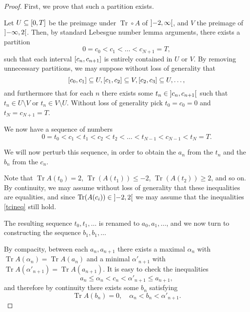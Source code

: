 \documentclass{article}
\theoremstyle{nonumberplain}
\newtheorem{proof}{Proof}
\DeclareMathOperator{\trace}{Tr}
\begin{document}
\begin{proof}
First, we prove that such a partition exists.

Let $U \subseteq \interval 0 T$ be the preimage under $\trace \circ A$ of $\ointerval{-2}\infty$, and $V$ the preimage of $\ointerval{-\infty}2$. Then, by standard Lebesgue number lemma arguments, there exists a partition 
\begin{equation}
0 = c_0 < c_1 < \dots < c_{N+1} = T,
\end{equation}
such that each interval $\interval{c_n}{c_{n+1}}$ is entirely contained in $U$ or $V$. By removing unnecessary partitions, we may suppose without loss of generality that
\begin{equation}
\interval{c_0}{c_1} \subseteq U, \interval{c_1}{c_2} \subseteq V, \interval{c_2}{c_3} \subseteq U, \dots,
\end{equation}
and furthermore that for each $n$ there exists some $t_n \in \ointerval{c_n}{c_{n+1}}$ such that $t_n \in U \setminus V$ or $t_n \in V \setminus U$. Without loss of generality pick $t_0 = c_0 = 0$ and $t_N = c_{N+1} = T$.

We now have a sequence of numbers
\begin{equation}\label{tcineq}
0 = t_0 < c_1 < t_1 < c_2 < t_2 < \dots < t_{N-1} < c_{N-1} < t_{N} = T.
\end{equation}

We will now perturb this sequence, in order to obtain the $a_n$ from the $t_n$ and the $b_n$ from the $c_n$.

Note that $\trace A(t_0) = 2$, $\trace(A(t_1)) \leq -2$, $\trace(A(t_2)) \geq 2$, and so on. By continuity, we may assume without loss of generality that these inequalities are equalities, and since $\trace(A(c_i)) \in \ointerval{-2}2$ we may assume that the inequalities \eqref{tcineq} still hold.

The resulting sequence $t_0, t_1, \dots$ is renamed to $a_0, a_1, \dots$, and we now turn to constructing the sequence $b_1, b_1, \dots$

By compacity, between each $a_n, a_{n+1}$ there exists a maximal $\alpha_n$ with $\trace A(\alpha_n) = \trace A(a_n)$ and a minimal $\alpha'_{n+1}$ with $\trace A(\alpha'_{n+1}) = \trace A(a_{n+1})$. It is easy to check the inequalities
\begin{equation}
a_n \leq \alpha_n < c_n <\alpha'_{n+1} \leq a_{n+1},
\end{equation}
and therefore by continuity there exists some $b_n$ satisfying
\begin{equation}
\trace A(b_n) = 0, \quad \alpha_n < b_n < \alpha'_{n+1}.
\end{equation}


\end{proof}
\end{document}
